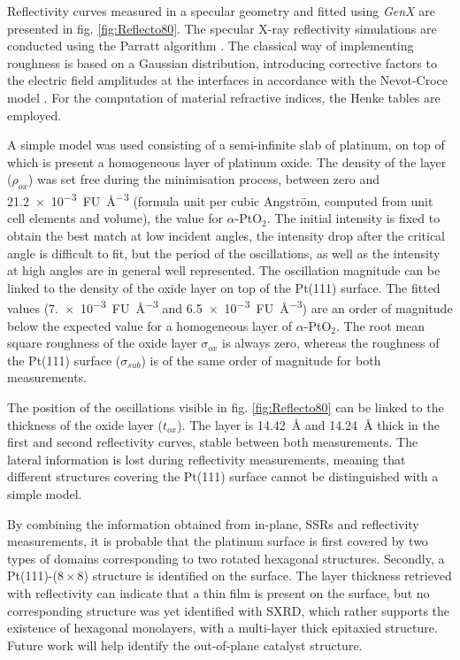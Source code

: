 Reflectivity curves measured in a specular geometry and fitted using \textit{GenX} \parencite{Bjorck2007, Glavic2022} are presented in fig. \ref{fig:Reflecto80}.
The specular X-ray reflectivity simulations are conducted using the Parratt algorithm \parencite{Parratt1954}.
The classical way of implementing roughness is based on a Gaussian distribution, introducing corrective factors to the electric field amplitudes at the interfaces in accordance with the Nevot-Croce model \parencite{Nevot1980}.
For the computation of material refractive indices, the Henke tables \parencite{Henke1993} are employed.

A simple model was used consisting of a semi-infinite slab of platinum, on top of which is present a homogeneous layer of platinum oxide.
The density of the layer ($\rho_{ox}$) was set free during the minimisation process, between zero and \qty{21.2e-3}{FU\per\cubic\angstrom} (formula unit per cubic Angström, computed from unit cell elements and volume), the value for $\alpha$-PtO$_2$.
The initial intensity is fixed to obtain the best match at low incident angles, the intensity drop after the critical angle is difficult to fit, but the period of the oscillations, as well as the intensity at high angles are in general well represented.
The oscillation magnitude can be linked to the density of the oxide layer on top of the Pt(111) surface.
The fitted values (\qty{7.e-3}{FU\per\cubic\angstrom} and \qty{6.5e-3}{FU\per\cubic\angstrom}) are an order of magnitude below the expected value for a homogeneous layer of $\alpha$-PtO$_2$.
The root mean square roughness of the oxide layer $\sigma_{ox}$ is always zero, whereas the roughness of the Pt(111) surface ($\sigma_{sub}$) is of the same order of magnitude for both measurements.

The position of the oscillations visible in fig. \ref{fig:Reflecto80} can be linked to the thickness of the oxide layer ($t_{ox}$).
The layer is \qty{14.42}{\angstrom} and \qty{14.24}{\angstrom} thick in the first and second reflectivity curves, stable between both measurements.
The lateral information is lost during reflectivity measurements, meaning that different structures covering the Pt(111) surface cannot be distinguished with a simple model.

By combining the information obtained from in-plane, SSRs and reflectivity measurements, it is probable that the platinum surface is first covered by two types of domains corresponding to two rotated hexagonal structures.
Secondly, a Pt(111)-($8\times8$) structure is identified on the surface.
The layer thickness retrieved with reflectivity can indicate that a thin film is present on the surface, but no corresponding structure was yet identified with SXRD, which rather supports the existence of hexagonal monolayers, with a multi-layer thick epitaxied structure.
Future work will help identify the out-of-plane catalyst structure.

